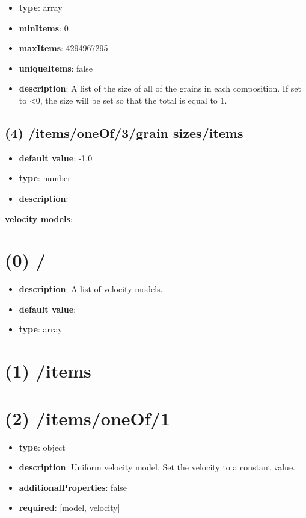 \begin{itemize}[leftmargin=3em]\item {\bf type}: array
\item {\bf minItems}: 0
\item {\bf maxItems}: 4294967295
\item {\bf uniqueItems}: false
\item {\bf description}: A list of the size of all of the grains in each composition. If set to <0, the size will be set so that the total is equal to 1.
\end{itemize}\subsection{(4) /items/oneOf/3/grain sizes/items}
\begin{itemize}[leftmargin=4em]\item {\bf default value}: -1.0
\item {\bf type}: number
\item {\bf description}: 
\end{itemize}\item {\bf velocity models}: \section{(0) /}
\begin{itemize}[leftmargin=0em]\item {\bf description}: A list of velocity models.
\item {\bf default value}: 
\item {\bf type}: array
\end{itemize}\section{(1) /items}

\section{(2) /items/oneOf/1}
\begin{itemize}[leftmargin=2em]\item {\bf type}: object
\item {\bf description}: Uniform velocity model. Set the velocity to a constant value.
\item {\bf additionalProperties}: false
\item {\bf required}: [model, velocity]\end{itemize}
